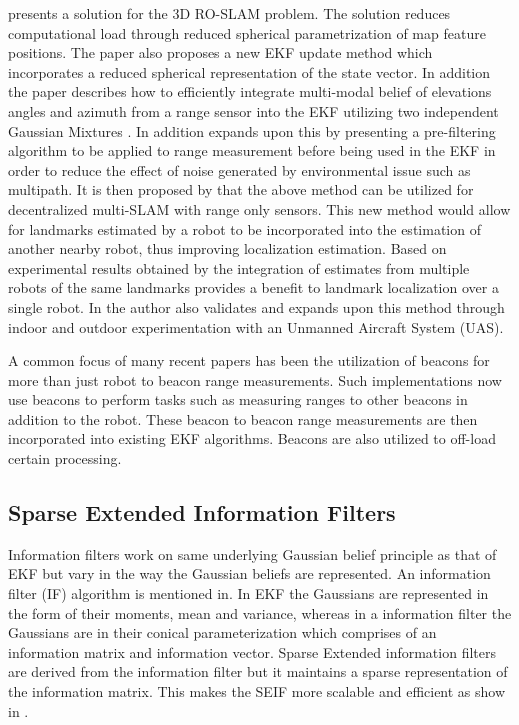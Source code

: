 \documentclass[conference]{IEEEtran}
\begin{document}
	\cite{Fabresse2013} presents a solution for the 3D RO-SLAM problem. The solution reduces computational load through reduced spherical parametrization of map feature positions. The paper also proposes a new EKF update method which incorporates a reduced spherical representation of the state vector. In addition the paper describes how to efficiently integrate multi-modal belief of elevations angles and azimuth from a range sensor into the EKF utilizing two independent Gaussian Mixtures \cite{Fabresse2013}. In addition \cite{Fabresse2014} expands upon this by presenting a pre-filtering algorithm to be applied to range measurement before being used in the EKF in order to reduce the effect of noise generated by environmental issue such as multipath. It is then proposed by \cite{Fabresse2015} that the above method can be utilized for decentralized multi-SLAM with range only sensors. This new method would allow for landmarks estimated by a robot to be incorporated into the estimation of another nearby robot, thus improving localization estimation. Based on experimental results obtained by \cite{Fabresse2015} the integration of estimates from multiple robots of the same landmarks provides a benefit to landmark localization over a single robot. In \cite{Fabresse2016} the author also validates and expands upon this method through indoor and outdoor experimentation with an Unmanned Aircraft System (UAS).  
	
	
	A common focus of many recent papers has been the utilization of beacons for more than just robot to beacon range measurements. Such implementations now use beacons to perform tasks such as measuring ranges to other beacons in addition to the robot. These beacon to beacon range measurements are then incorporated into existing EKF algorithms. Beacons are also utilized to off-load certain processing.
	
\subsection{Sparse Extended Information Filters}

Information filters work on same underlying Gaussian belief principle as that of EKF but vary in the way the Gaussian beliefs are represented. An information filter (IF) algorithm is mentioned in\cite{Torres-Gonzalez2014}. In EKF the Gaussians are represented in the form of their moments, mean and variance, whereas in a information filter the Gaussians are in their conical parameterization which comprises of an information matrix and information vector. 
Sparse Extended information filters are derived from the  information filter but it maintains a sparse representation of the information matrix. This makes the SEIF more scalable and efficient as show in \cite{Torres-Gonzalez2014}.
\end{document}
